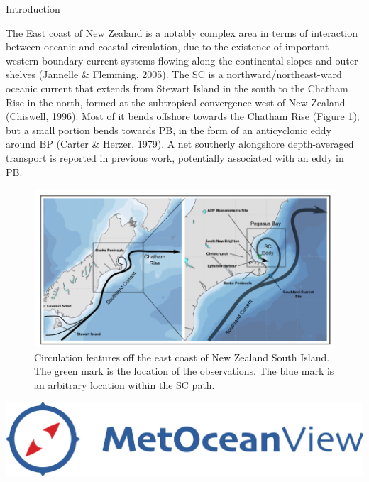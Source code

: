 \documentclass[final]{beamer}
\newlength{\onecolwid}
\begin{document}
\begin{frame}[t]
\begin{columns}[t]
\begin{column}{\onecolwid}
    \begin{block}{Introduction}

    The East coast of New Zealand is a notably complex area in terms of interaction between oceanic and coastal circulation, due to the existence of important western boundary current systems flowing along the continental slopes and outer shelves (Jannelle \& Flemming, 2005). The SC is a northward/northeast-ward oceanic current that extends from Stewart Island in the south to the Chatham Rise in the north, formed at the subtropical convergence west of New Zealand (Chiswell, 1996). Most of it bends offshore towards the Chatham Rise (Figure \ref{schematics}), but a small portion bends towards PB, in the form of an anticyclonic eddy around BP (Carter \& Herzer, 1979). A net southerly alongshore depth-averaged transport is reported in previous work, potentially associated with an eddy in PB. 
    \begin{figure}
    \includegraphics[width=1.0\linewidth]{schematics.png}
    \caption{\label{schematics} Circulation features off the east coast of New Zealand South Island. The green mark is the location of the observations. The blue mark is an arbitrary location within the SC path.}
    \end{figure}


    \end{block}

    \vspace{3.2cm}
    \includegraphics[width=0.9\linewidth]{metoceanview2.jpg}


\end{column}
\end{columns}
\end{frame}
\end{document}
